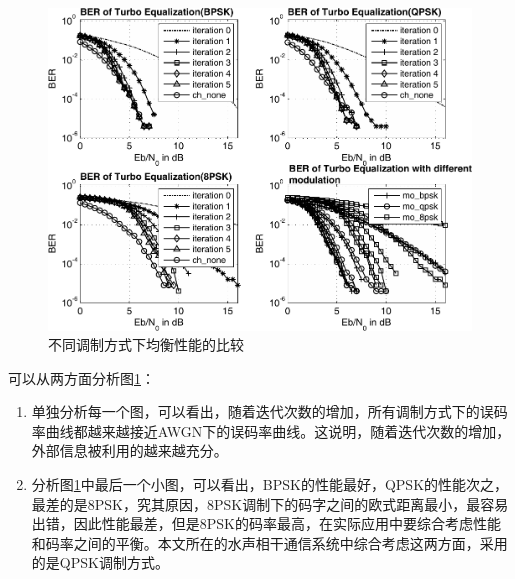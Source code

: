 \begin{figure}[htb]
  \begin{center}
    \includegraphics[width=\textwidth]{images/different_mod_separate_bw.pdf}
  \end{center}
  \caption{不同调制方式下均衡性能的比较}
  \label{fig:3.4}
\end{figure}

可以从两方面分析图\ref{fig:3.4}：
\begin{enumerate}
    \item
        单独分析每一个图，可以看出，随着迭代次数的增加，所有调制方式下的误码率曲线都越来越接近AWGN下的误码率曲线。这说明，随着迭代次数的增加，外部信息被利用的越来越充分。
    \item
        分析图\ref{fig:3.4}中最后一个小图，可以看出，BPSK的性能最好，QPSK的性能次之，最差的是8PSK，究其原因，8PSK调制下的码字之间的欧式距离最小，最容易出错，因此性能最差，但是8PSK的码率最高，在实际应用中要综合考虑性能和码率之间的平衡。本文所在的水声相干通信系统中综合考虑这两方面，采用的是QPSK调制方式。
\end{enumerate}

